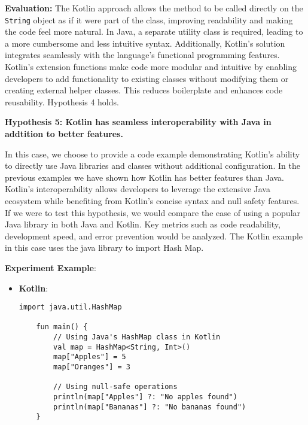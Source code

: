 \vspace{1em}

\noindent \textbf{Evaluation:}  
The Kotlin approach allows the method to be called directly on the \texttt{String} object as if it were part of the class, improving readability and making the code feel more natural. In Java, a separate utility class is required, leading to a more cumbersome and less intuitive syntax. Additionally, Kotlin’s solution integrates seamlessly with the language’s functional programming features. Kotlin's extension functions make code more modular and intuitive by enabling developers to add functionality to existing classes without modifying them or creating external helper classes. This reduces boilerplate and enhances code reusability. Hypothesis 4 holds. 

\vspace{1em}

\noindent \textbf{Hypothesis 5: Kotlin has seamless interoperability with Java in addtition to better features.}

\vspace{1em}

\noindent In this case, we choose to provide a code example demonstrating Kotlin's ability to directly use Java libraries and classes without additional configuration. In the previous examples we have shown how Kotlin has better features than Java. Kotlin's interoperability allows developers to leverage the extensive Java ecosystem while benefiting from Kotlin's concise syntax and null safety features. If we were to test this hypothesis, we would compare the ease of using a popular Java library in both Java and Kotlin. Key metrics such as code readability, development speed, and error prevention would be analyzed. The Kotlin example in this case uses the java library to import Hash Map.

\vspace{1em}

\noindent \textbf{Experiment Example}:

\begin{tcolorbox}[colframe=blue!80!black, colback=blue!5!white, coltitle=blue!50!black, title={-}, boxrule=0.5mm, width=0.8\textwidth, sharp corners=south]
    \begin{itemize}
        \item \textbf{\scriptsize Kotlin}:
        \begin{lstlisting}[style=kotlin, basicstyle=\scriptsize\ttfamily]
    import java.util.HashMap

    fun main() {
        // Using Java's HashMap class in Kotlin
        val map = HashMap<String, Int>()
        map["Apples"] = 5
        map["Oranges"] = 3

        // Using null-safe operations
        println(map["Apples"] ?: "No apples found")
        println(map["Bananas"] ?: "No bananas found")
    }
        \end{lstlisting}
    \end{itemize}
\end{tcolorbox}

